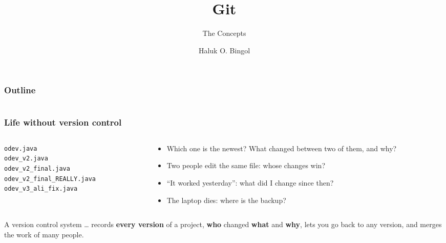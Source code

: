 \documentclass[aspectratio=169,10pt,compress]{beamer}
\title{Git}
\subtitle{The Concepts}
\author[Bingol]{Haluk O. Bingol}
\institute[FCIS]{
    Faculty of Computer and Information Sciences\\
    Yeditepe University
}
\date{
	{\tiny \hbTimeStamp}
}
\begin{document}
\begin{frame}[t,fragile]
  \titlepage
\end{frame}




\begin{frame}[t,fragile] \frametitle{Outline}
  \begin{columns}[T]
    \begin{column}{0.48\textwidth}
      \tableofcontents[sections={1-5}, hideallsubsections]
    \end{column}
    \begin{column}{0.48\textwidth}
      \tableofcontents[sections={6-10}, hideallsubsections]
    \end{column}
  \end{columns}
\end{frame}





\begin{frame}[t,fragile] \frametitle{Life without version control}
  \begin{columns}[T]
    \begin{column}{0.46\textwidth}


\begin{lstlisting}[style=codesnippet, language={}, basicstyle=\ttfamily\footnotesize]
odev.java
odev_v2.java
odev_v2_final.java
odev_v2_final_REALLY.java
odev_v3_ali_fix.java
\end{lstlisting}


    \end{column}
    \begin{column}{0.5\textwidth}
      \begin{itemize}\small
        \item Which one is the newest? What changed between two of them, and why?
        \item Two people edit the same file: whose changes win?
        \item ``It worked yesterday'': what did I change since then?
        \item The laptop dies: where is the backup?
      \end{itemize}
    \end{column}
  \end{columns}
  \begin{block}{A version control system \dots}
    \small records \textbf{every version} of a project, \textbf{who} changed \textbf{what} and \textbf{why}, lets you go back to any version,
    and merges the work of many people.
  \end{block}
\end{frame}
\end{document}
